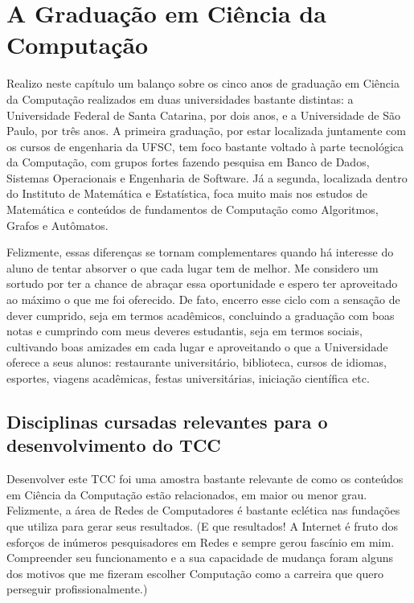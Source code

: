 \chapter{A Graduação em Ciência da Computação}
\label{cap:a_graduacao}
Realizo neste capítulo um balanço sobre os cinco anos de graduação em Ciência
da Computação realizados em duas universidades bastante distintas: a 
Universidade Federal de Santa Catarina, por dois anos, e a Universidade de São
Paulo, por três anos. A primeira graduação, por estar localizada juntamente
com os cursos de engenharia da UFSC, tem foco bastante voltado à parte
tecnológica da Computação, com grupos fortes fazendo pesquisa em Banco de Dados,
Sistemas Operacionais e Engenharia de Software. Já a segunda, localizada dentro
do Instituto de Matemática e Estatística, foca muito mais nos estudos de 
Matemática e conteúdos de fundamentos de Computação como Algoritmos, Grafos e 
Autômatos. 

Felizmente, essas diferenças se tornam complementares quando há interesse 
do aluno de tentar absorver o que cada lugar tem de melhor. Me considero um
sortudo por ter a chance de abraçar essa oportunidade e espero ter aproveitado
ao máximo o que me foi oferecido. De fato, encerro esse ciclo com a sensação de
dever cumprido, seja em termos acadêmicos, concluindo a graduação com boas notas
e cumprindo com meus deveres estudantis, seja em termos sociais, cultivando 
boas amizades em cada lugar e aproveitando o que a Universidade oferece a seus
alunos: restaurante universitário, biblioteca, cursos de idiomas, esportes,
viagens acadêmicas, festas universitárias, iniciação científica etc.

\section{Disciplinas cursadas relevantes para o desenvolvimento do TCC}
\label{sec:disciplinas_relevantes}
Desenvolver este TCC foi uma amostra bastante relevante de como os conteúdos em
Ciência da Computação estão relacionados, em maior ou menor grau. Felizmente, 
a área de Redes de Computadores é bastante eclética nas fundações que utiliza
para gerar seus resultados. (E que resultados! A Internet é fruto dos esforços
de inúmeros pesquisadores em Redes e sempre gerou fascínio em mim. Compreender
seu funcionamento e a sua capacidade de mudança foram alguns dos motivos que 
me fizeram escolher Computação como a carreira que quero perseguir
profissionalmente.)

